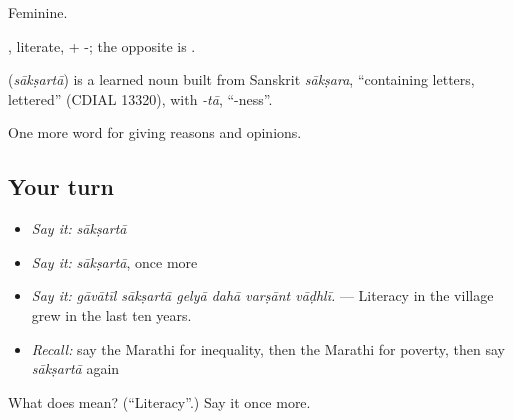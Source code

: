 Feminine.

, literate, + -; the opposite is .

\begin{cousinweb}
\textbf{} (\emph{sākṣartā}) is a learned noun built from Sanskrit \emph{sākṣara}, \textquotedblleft{}containing letters, lettered\textquotedblright{} (CDIAL 13320), with \emph{-tā}, \textquotedblleft{}-ness\textquotedblright{}.
\end{cousinweb}

\begin{grammarlens}[title={What you've built}]
One more word for giving reasons and opinions.
\end{grammarlens}

\subsection*{Your turn}
\begin{itemize}
\raggedright
  \item \emph{Say it:} \emph{sākṣartā}
  \item \emph{Say it:} \emph{sākṣartā}, once more
  \item \emph{Say it:} \emph{gāvātīl sākṣartā gelyā dahā varṣānt vāḍhlī.} — Literacy in the village grew in the last ten years.
  \item \emph{Recall:} say the Marathi for inequality, then the Marathi for poverty, then say \emph{sākṣartā} again
\end{itemize}

\begin{tcolorbox}[breakable,colback=teal!4,colframe=teal!35!black,title={Before you move on}]
What does  mean? (\textquotedblleft{}Literacy\textquotedblright{}.) Say it once more.
\end{tcolorbox}
